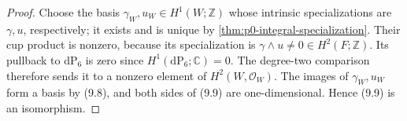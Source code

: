 \begin{proof}
Choose the basis \(\gamma_W,u_W\in H^1(W;\mathbb Z)\) whose intrinsic
specializations are \(\gamma,u\), respectively; it exists and is unique by
\cref{thm:p0-integral-specialization}.  Their cup product is nonzero,
because its specialization is
\(\gamma\wedge u\ne0\in H^2(F;\mathbb Z)\).  Its pullback to
\(\mathrm{dP}_6\) is zero since
\(H^1(\mathrm{dP}_6;\mathbb C)=0\).  The degree-two comparison therefore
sends it to a nonzero element of \(H^2(W,\mathcal O_W)\).  The images of
\(\gamma_W,u_W\) form a basis by (9.8), and both sides of (9.9) are
one-dimensional.  Hence (9.9) is an isomorphism.
\end{proof}
